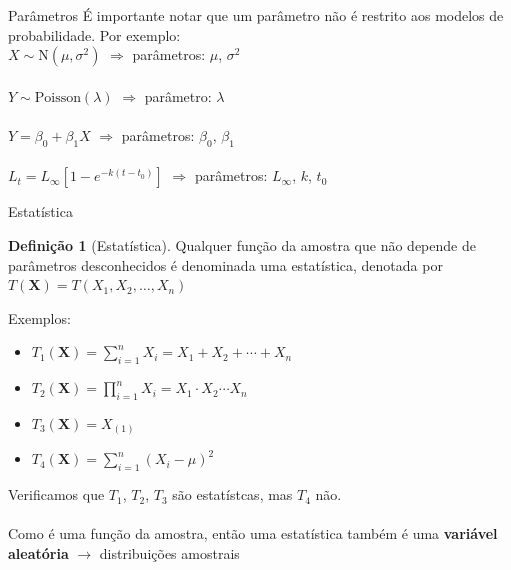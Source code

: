 \documentclass[10pt]{beamer}\usepackage[]{graphicx}\usepackage[]{color}
\newcommand{\mb}[1]{\mathbf{#1}}
\providecommand{\N}{\text{N}}
\theoremstyle{definition}
\newtheorem*{mydef}{Definição}
\begin{document}

\begin{frame}{Parâmetros}
  É importante notar que um parâmetro não é restrito aos modelos de
  probabilidade. Por exemplo: \\
  \vspace{1em}
  $X \sim \N(\mu, \sigma^2)$ $\Rightarrow$ parâmetros: $\mu$,
    $\sigma^2$ \\~\\
    $Y \sim \text{Poisson}(\lambda)$ $\Rightarrow$ parâmetro: $\lambda$ \\~\\
    $Y = \beta_0 + \beta_1 X$ $\Rightarrow$ parâmetros: $\beta_0$,
    $\beta_1$ \\~\\
    $L_t = L_{\infty}[1 - e^{-k(t - t_0)}]$ $\Rightarrow$ parâmetros:
    $L_{\infty}$, $k$, $t_0$
\end{frame}

\begin{frame}{Estatística}
  \begin{mydef}[Estatística]
    Qualquer função da amostra que não depende de parâmetros
    desconhecidos é denominada uma estatística, denotada por $T(\mb{X}) =
    T(X_1, X_2, \ldots, X_n)$
  \end{mydef}
  Exemplos:
  \begin{itemize}
  \item $T_1(\mb{X}) = \sum_{i=1}^{n} X_i = X_1 + X_2 + \cdots + X_n$
  \item $T_2(\mb{X}) = \prod_{i=1}^{n} X_i = X_1 \cdot X_2 \cdots X_n$
  \item $T_3(\mb{X}) = X_{(1)}$
  \item $T_4(\mb{X}) = \sum_{i=1}^{n} (X_i - \mu)^2$
  \end{itemize}
  \vspace{1em}
  Verificamos que $T_1$, $T_2$, $T_3$ são estatístcas, mas $T_4$
  não. \\~\\
  Como é uma função da amostra, então uma estatística também é uma
  \textbf{variável aleatória} $\rightarrow$ distribuições amostrais
\end{frame}
\end{document}
